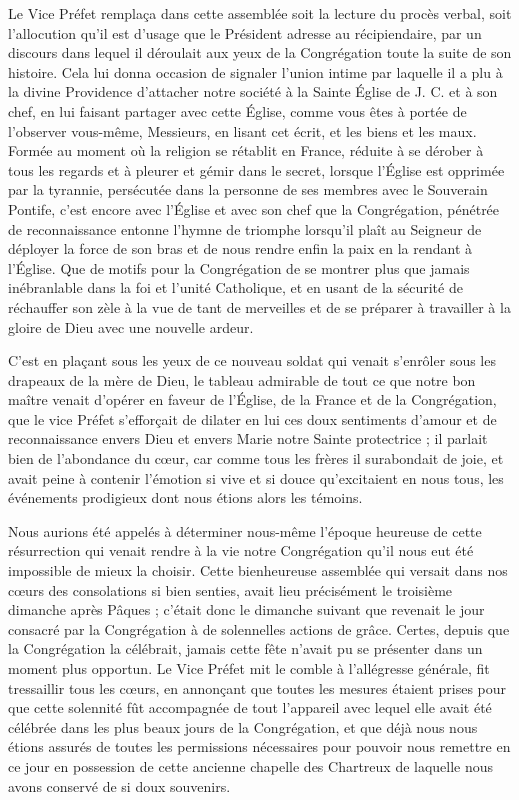 Le Vice Préfet remplaça dans cette assemblée soit la lecture du procès verbal, soit l'allocution qu'il est d'usage que le Président adresse au récipiendaire, par un discours dans lequel il déroulait aux yeux de la Congrégation toute la suite de son histoire. Cela lui donna occasion de signaler l'union intime par laquelle il a plu à la divine Providence d'attacher notre société à la Sainte Église de J. C. et à son chef, en lui faisant partager avec cette Église, comme vous êtes à portée de l'observer vous-même, Messieurs, en lisant cet écrit, et les biens et les maux. Formée au moment où la religion se rétablit en France, réduite à se dérober à tous les regards et à pleurer et gémir dans le secret, lorsque l'Église est opprimée par la tyrannie, persécutée dans la personne de ses membres avec le Souverain Pontife, c'est encore avec l'Église et avec son chef que la Congrégation, pénétrée de reconnaissance entonne l'hymne de triomphe lorsqu'il plaît au Seigneur de déployer la force de son bras et de nous rendre enfin la paix en la rendant à l'Église. Que de motifs pour la Congrégation de se montrer plus que jamais inébranlable dans la foi et l'unité Catholique, et en usant de la sécurité de réchauffer son zèle à la vue de tant de merveilles et de se préparer à travailler à la gloire de Dieu avec une nouvelle ardeur.

C'est en plaçant sous les yeux de ce nouveau soldat qui venait s'enrôler sous les drapeaux de la mère de Dieu, le tableau admirable de tout ce que notre bon maître venait d'opérer en faveur de l'Église, de la France et de la Congrégation, que le vice Préfet s'efforçait de dilater en lui ces doux sentiments d'amour et de
reconnaissance envers Dieu et envers Marie notre Sainte protectrice ; il parlait bien de l'abondance du cœur, car comme tous les frères il surabondait de joie, et avait peine à contenir l'émotion si vive et si douce qu'excitaient en nous tous, les événements prodigieux dont nous étions alors les témoins.

Nous aurions été appelés à déterminer nous-même l'époque heureuse de cette résurrection qui venait rendre à la vie notre Congrégation qu'il nous eut été impossible de mieux la choisir. Cette bienheureuse assemblée qui versait dans nos cœurs des consolations si bien senties, avait lieu précisément le troisième dimanche après Pâques ; c'était donc le dimanche suivant que revenait le jour consacré par la Congrégation à de solennelles actions de grâce. Certes, depuis que la Congrégation la célébrait, jamais cette fête n'avait pu se présenter dans un moment plus opportun. Le Vice Préfet mit le comble à l'allégresse générale, fit tressaillir tous les cœurs, en annonçant que toutes les mesures étaient prises pour que cette solennité fût accompagnée de tout l'appareil avec lequel elle avait été célébrée dans les plus beaux jours de la Congrégation, et que déjà nous nous étions assurés de toutes les permissions nécessaires pour pouvoir nous remettre en ce jour en possession de cette ancienne chapelle des Chartreux de laquelle nous avons conservé de si doux souvenirs.


